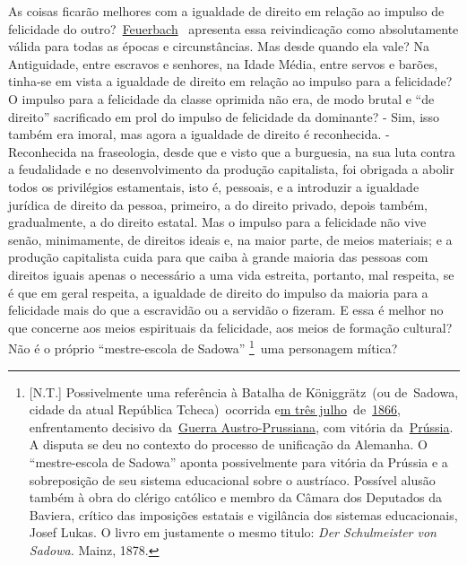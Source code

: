 As coisas ficarão melhores com a igualdade de direito em relação ao
impulso de felicidade do
outro?~\href{https://www.marxists.org/portugues/dicionario/verbetes/f/feuerbach.htm}{Feuerbach}~
apresenta essa reivindicação como absolutamente válida para todas as
épocas e circunstâncias. Mas desde quando ela vale? Na Antiguidade,
entre escravos e senhores, na Idade Média, entre servos e barões,
tinha-se em vista a igualdade de direito em relação ao impulso para a
felicidade? O impulso para a felicidade da classe oprimida não era, de
modo brutal e ``de direito'' sacrificado em prol do impulso de
felicidade da dominante? - Sim, isso também era imoral, mas agora a
igualdade de direito é reconhecida. - Reconhecida na fraseologia, desde
que e visto que a burguesia, na sua luta contra a feudalidade e no
desenvolvimento da produção capitalista, foi obrigada a abolir todos os
privilégios estamentais, isto é, pessoais, e a introduzir a igualdade
jurídica de direito da pessoa, primeiro, a do direito privado, depois
também, gradualmente, a do direito estatal. Mas o impulso para a
felicidade não vive senão, minimamente, de direitos ideais e, na maior
parte, de meios materiais; e a produção capitalista cuida para que caiba
à grande maioria das pessoas com direitos iguais apenas o necessário a
uma vida estreita, portanto, mal respeita, se é que em geral respeita, a
igualdade de direito do impulso da maioria para a felicidade mais do que
a escravidão ou a servidão o fizeram. E essa é melhor no que concerne
aos meios espirituais da felicidade, aos meios de formação cultural? Não
é o próprio ``mestre-escola de Sadowa''\protect\hypertarget{n197}{}{}
\footnote{{[}N.T.{]} Possivelmente uma referência à Batalha de
  Königgrätz~(ou de~Sadowa, cidade da atual República Tcheca)~ocorrida
  e\href{https://pt.wikipedia.org/wiki/3_de_julho}{m três
  julho}~de~\href{https://pt.wikipedia.org/wiki/1866}{1866},
  enfrentamento decisivo
  da~\href{https://pt.wikipedia.org/wiki/Guerra_Austro-Prussiana}{Guerra
  Austro-Prussiana}, com vitória
  da~\href{https://pt.wikipedia.org/wiki/Reino_da_Pr\%C3\%BAssia}{Prússia}.
  A disputa se deu no contexto do processo de unificação da Alemanha. O
  ``mestre-escola de Sadowa'' aponta possivelmente para vitória da
  Prússia e a sobreposição de seu sistema educacional sobre o austríaco.
  Possível alusão também à obra do clérigo católico e membro da Câmara
  dos Deputados da Baviera, crítico das imposições estatais e vigilância
  dos sistemas educacionais, Josef Lukas. O livro em justamente o mesmo
  titulo: \emph{Der Schulmeister von Sadowa.} Mainz, 1878.}~uma
personagem mítica?

